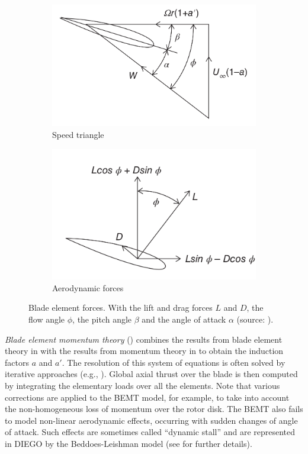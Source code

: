 \begin{figure}[h!]
    \begin{subfigure}[b]{0.5\textwidth}
        \centering
        \includegraphics[width=0.9\linewidth]{./part1/figures/speed_triangle.png}
        \caption{Speed triangle}
    \end{subfigure}
    \begin{subfigure}[b]{0.5\textwidth}
        \centering
        \includegraphics[width=0.9\linewidth]{./part1/figures/aerodyn_blade.png}
        \caption{Aerodynamic forces}
    \end{subfigure}
    \caption{Blade element forces. With the lift and drag forces $L$ and $D$, the flow angle $\phi$, the pitch angle $\beta$ and the angle of attack $\alpha$ (source: \citealp{burton_2021_wind_handbook}).}
    \label{fig:blade_theory}
\end{figure}
\textit{Blade element momentum theory} () combines the results from blade element theory in  with the results from momentum theory in  to obtain the induction factors $a$ and $a'$. 
The resolution of this system of equations is often solved by iterative approaches (e.g., \citealp{dai_2011_BEMT}). 
Global axial thrust over the blade is then computed by integrating the elementary loads over all the elements. 
Note that various corrections are applied to the BEMT model, for example, to take into account the non-homogeneous loss of momentum over the rotor disk. 
The BEMT also fails to model non-linear aerodynamic effects, occurring with sudden changes of angle of attack. 
Such effects are sometimes called ``dynamic stall'' and are represented in DIEGO by the Beddoes-Leishman model (see \citealp{burton_2021_wind_handbook} for further details).  

